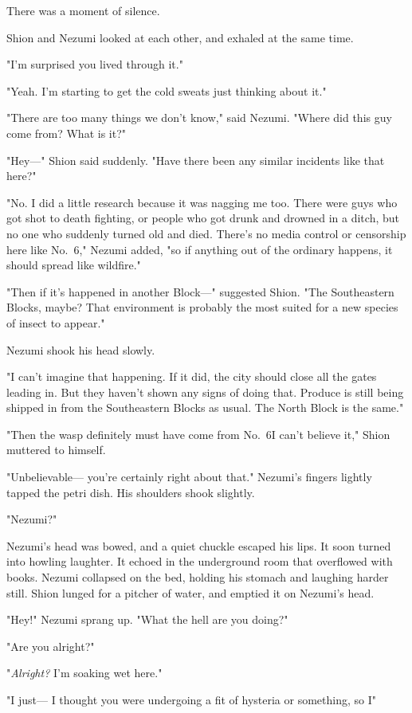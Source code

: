 There was a moment of silence.

Shion and Nezumi looked at each other, and exhaled at the same time.

"I'm surprised you lived through it."

"Yeah. I'm starting to get the cold sweats just thinking about it."

"There are too many things we don't know," said Nezumi. "Where did this
guy come from? What is it?"

"Hey---" Shion said suddenly. "Have there been any similar incidents like
that here?"

"No. I did a little research because it was nagging me too. There were
guys who got shot to death fighting, or people who got drunk and drowned
in a ditch, but no one who suddenly turned old and died. There's no
media control or censorship here like No.~6," Nezumi added, "so if
anything out of the ordinary happens, it should spread like wildfire."

"Then if it's happened in another Block---" suggested Shion. "The
Southeastern Blocks, maybe? That environment is probably the most suited
for a new species of insect to appear."

Nezumi shook his head slowly.

"I can't imagine that happening. If it did, the city should close all
the gates leading in. But they haven't shown any signs of doing that.
Produce is still being shipped in from the Southeastern Blocks as usual.
The North Block is the same."

"Then the wasp definitely must have come from No.~6\el I can't believe
it," Shion muttered to himself.

"Unbelievable--- you're certainly right about that." Nezumi's fingers
lightly tapped the petri dish. His shoulders shook slightly.

"Nezumi?"

Nezumi's head was bowed, and a quiet chuckle escaped his lips. It soon
turned into howling laughter. It echoed in the underground room that
overflowed with books. Nezumi collapsed on the bed, holding his stomach
and laughing harder still. Shion lunged for a pitcher of water, and
emptied it on Nezumi's head.

"Hey!" Nezumi sprang up. "What the hell are you doing?"

"Are you alright?"

"\emph{Alright?} I'm soaking wet here."

"I just--- I thought you were undergoing a fit of hysteria or something,
so I\el "

